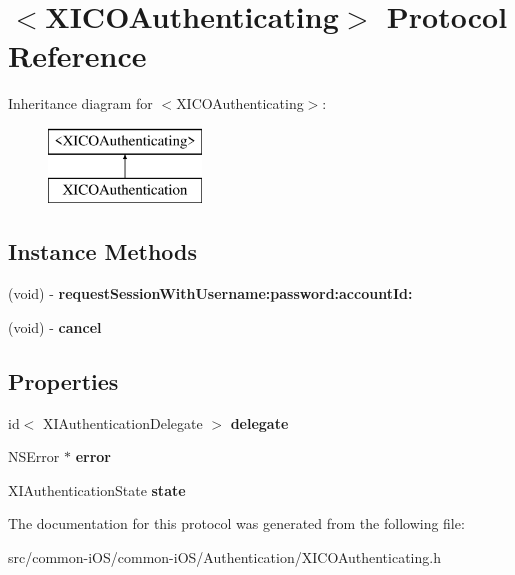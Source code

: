 \hypertarget{protocol_x_i_c_o_authenticating-p}{}\section{$<$X\+I\+C\+O\+Authenticating$>$ Protocol Reference}
\label{protocol_x_i_c_o_authenticating-p}
Inheritance diagram for $<$X\+I\+C\+O\+Authenticating$>$\+:\begin{figure}[H]
\begin{center}
\leavevmode
\includegraphics[height=2.000000cm]{protocol_x_i_c_o_authenticating-p}
\end{center}
\end{figure}
\subsection*{Instance Methods}
\begin{DoxyCompactItemize}
\item 
\hypertarget{protocol_x_i_c_o_authenticating-p_aa25b35bac051bd900a6669fcfe17092e}{}\label{protocol_x_i_c_o_authenticating-p_aa25b35bac051bd900a6669fcfe17092e} 
(void) -\/ {\bfseries request\+Session\+With\+Username\+:password\+:account\+Id\+:}
\item 
\hypertarget{protocol_x_i_c_o_authenticating-p_a695f56a6d0cfee2eecb198064d0519cf}{}\label{protocol_x_i_c_o_authenticating-p_a695f56a6d0cfee2eecb198064d0519cf} 
(void) -\/ {\bfseries cancel}
\end{DoxyCompactItemize}
\subsection*{Properties}
\begin{DoxyCompactItemize}
\item 
\hypertarget{protocol_x_i_c_o_authenticating-p_aa0b46f0d764298bffd836c423bf6dc0a}{}\label{protocol_x_i_c_o_authenticating-p_aa0b46f0d764298bffd836c423bf6dc0a} 
id$<$ X\+I\+Authentication\+Delegate $>$ {\bfseries delegate}
\item 
\hypertarget{protocol_x_i_c_o_authenticating-p_af95218ee1e738d0b266b106db522dab8}{}\label{protocol_x_i_c_o_authenticating-p_af95218ee1e738d0b266b106db522dab8} 
N\+S\+Error $\ast$ {\bfseries error}
\item 
\hypertarget{protocol_x_i_c_o_authenticating-p_a5dabd4d9015c2b31128ca5f2c8dd72b2}{}\label{protocol_x_i_c_o_authenticating-p_a5dabd4d9015c2b31128ca5f2c8dd72b2} 
X\+I\+Authentication\+State {\bfseries state}
\end{DoxyCompactItemize}


The documentation for this protocol was generated from the following file\+:\begin{DoxyCompactItemize}
\item 
src/common-\/i\+O\+S/common-\/i\+O\+S/\+Authentication/X\+I\+C\+O\+Authenticating.\+h\end{DoxyCompactItemize}
